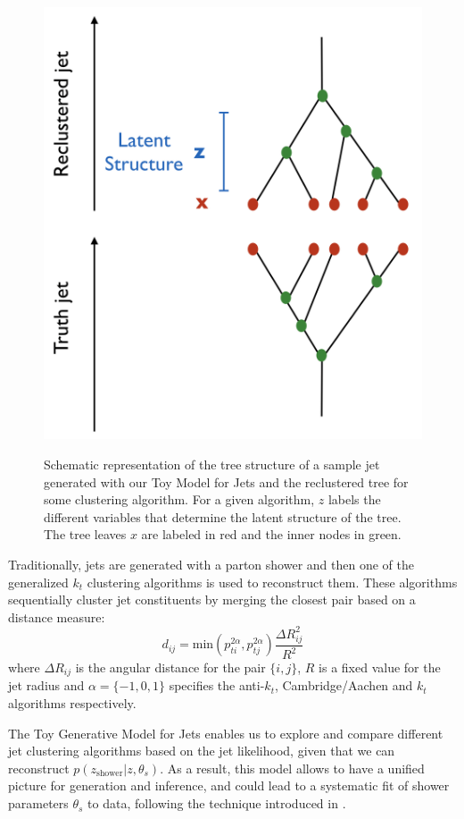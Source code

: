 \documentclass[12pt]{article}
\def\beq{\begin{equation}}
\def\eeq{\end{equation}}
\def\beq{\begin{equation}}
\def\eeq{\end{equation}}
\begin{document}
\begin{figure}
{
  \includegraphics[width=0.4\linewidth]{plots/JetLatentStructure.png}
}
\caption{\small{Schematic representation of the tree structure of a sample jet generated with our Toy Model for Jets and the reclustered tree for some clustering algorithm. For a given algorithm, $z$ labels the different variables that determine the latent structure of the tree. The tree leaves $x$ are labeled in red and the inner nodes in green. 
}}
\label{fig:treestructure}
\end{figure}

Traditionally, jets are generated with a parton shower and then one of the generalized $k_t$ clustering algorithms is used to reconstruct them. These algorithms sequentially cluster jet constituents by merging the closest pair based on a distance measure:
\beq\label{eq:dij}
d_{ij}=\text{min}(p_{ti}^{2 \alpha},p_{tj}^{2 \alpha}) \frac{\Delta R_{ij}^2}{R^2}
\eeq
where $\Delta R_{ij}$ is the angular distance for the pair $\{i,j\}$, $R$ is a fixed value for the jet radius and  $\alpha = \{-1,0,1\}$ specifies the anti-$k_t$, Cambridge/Aachen and $k_t$ algorithms respectively.

The Toy Generative Model for Jets enables us to explore and compare different jet clustering algorithms based on the jet likelihood, given that we can reconstruct  $p(z_{\text{shower}}|z,\theta_s) $. As a result, this model allows to have a unified picture for generation and inference, and could lead to a systematic fit of shower parameters $\theta_s$ to data, following the technique introduced in \cite{Brehmer:2018kdj}.
 
\end{document}

